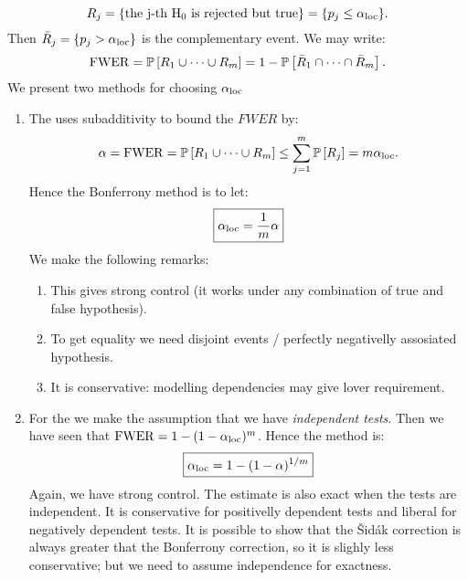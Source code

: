 $$
    R_j = \{\textrm{the j-th $\mathrm{H}_0$ is rejected but true}\} = \{p_j \leq \alpha_{\mathrm{loc}}\}.
$$
Then $\bar{R}_j=\{p_j > \alpha_{\mathrm{loc}}\}$ is the complementary event. We may write:
\begin{align*}
    \mathrm{FWER} 
    = \mathbb{P}\left[R_1\cup\dots\cup R_m\right] = 1 - \mathbb{P}\left[\bar{R}_1\cap\dots\cap \bar{R}_m\right].
\end{align*}
We present two methods for choosing $\alpha_{\mathrm{loc}}$
\begin{enumerate}
    \item The  uses subadditivity to bound the $FWER$ by:
    $$
        \alpha = \mathrm{FWER} = \mathbb{P}\left[R_1\cup\dots\cup R_m\right] \leq \sum_{j=1}^m \mathbb{P}\left[R_j\right] = m \alpha_{\mathrm{loc}}.
    $$
    Hence the Bonferrony method is to let:
    \begin{equation}
        \boxed{\alpha_{\mathrm{loc}} = \frac{1}{m} \alpha}
    \end{equation}
    We make the following remarks:
    \begin{enumerate}
        \item This gives strong control (it works under any combination of true and false hypothesis).
        \item To get equality we need disjoint events / perfectly negativelly assosiated hypothesis.
        \item It is conservative: modelling dependencies may give lover requirement.
    \end{enumerate}
    \item For the  we make the assumption that we have \emph{independent tests}. Then we have seen that $\mathrm{FWER} = 1-(1-\alpha_{\mathrm{loc}})^m$. Hence the method is:
    \begin{equation}
        \boxed{\alpha_{\mathrm{loc}} = 1-(1-\alpha)^{1/m}}
    \end{equation}
    Again, we have strong control. The estimate is also exact when the tests are independent. It is conservative for positivelly dependent tests and liberal for negatively dependent tests. It is possible to show that the Šidák correction is always greater that the Bonferrony correction, so it is slighly less conservative; but we need to assume independence for exactness. 
\end{enumerate}

